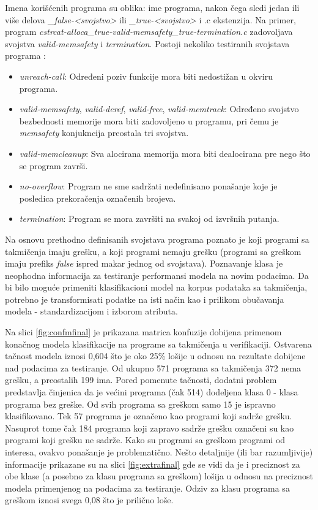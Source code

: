 \documentclass[12pt,oneside]{memoir}
\begin{document}
Imena korišćenih programa su oblika: ime programa, nakon čega sledi jedan ili više delova \textit{\_false-<svojstvo>} ili \textit{\_true-<svojstvo>} i .c ekstenzija. Na primer, program \textit{cstrcat-alloca\_true-valid-memsafety\_true-termination.c} zadovoljava svojstva \textit{valid-memsafety} i \textit{termination}. Postoji nekoliko testiranih svojstava programa \cite{benchmarks}:
\begin{itemize}
	\item \textit{unreach-call}: Određeni poziv funkcije mora biti nedostižan u okviru programa.
	\item \textit{valid-memsafety}, \textit{valid-deref}, \textit{valid-free}, \textit{valid-memtrack}: Određeno svojstvo bezbednosti memorije mora biti zadovoljeno u programu, pri čemu je \textit{memsafety} konjukncija preostala tri svojstva.
	\item \textit{valid-memcleanup}: Sva alocirana memorija mora biti dealocirana pre nego što se program završi.
	\item \textit{no-overflow}: Program ne sme sadržati nedefinisano ponašanje koje je posledica prekoračenja označenih brojeva.
	\item \textit{termination}: Program se mora završiti na svakoj od izvršnih putanja.
\end{itemize}

Na osnovu prethodno definisanih svojstava programa poznato je koji programi sa takmičenja imaju grešku, a koji programi nemaju grešku (programi sa greškom imaju prefiks \textit{false} ispred makar jednog od svojstava). Poznavanje klasa je neophodna informacija za testiranje performansi modela na novim podacima. Da bi bilo moguće primeniti klasifikacioni model na korpus podataka sa takmičenja, potrebno je transformisati podatke na isti način kao i prilikom obučavanja modela - standardizacijom i izborom atributa. 

Na slici \ref{fig:confmfinal} je prikazana matrica konfuzije dobijena primenom konačnog modela klasifikacije na programe sa takmičenja u verifikaciji. Ostvarena tačnost modela iznosi 0,604 što je oko 25\% lošije u odnosu na rezultate dobijene nad podacima za testiranje. %
Od ukupno 571 programa sa takmičenja 372 nema grešku, a preostalih 199 ima. 
Pored pomenute tačnosti, dodatni problem predstavlja činjenica da je većini programa (čak 514) dodeljena klasa 0 - klasa programa bez greške. Od svih programa sa greškom samo 15 je ispravno klasifikovano. Tek 57 programa je označeno kao programi koji sadrže grešku. Nasuprot tome čak 184 programa koji zapravo sadrže grešku označeni su kao programi koji grešku ne sadrže. Kako su programi sa greškom programi od interesa, ovakvo ponašanje je problematično. Nešto detaljnije (ili bar razumljivije) informacije prikazane su na slici \ref{fig:extrafinal} gde se vidi da je i preciznost za obe klase (a posebno za klasu programa sa greškom) lošija u odnosu na preciznost modela primenjenog na podacima za testiranje. Odziv za klasu programa sa greškom iznosi svega 0,08 što je prilično loše.
\end{document}

